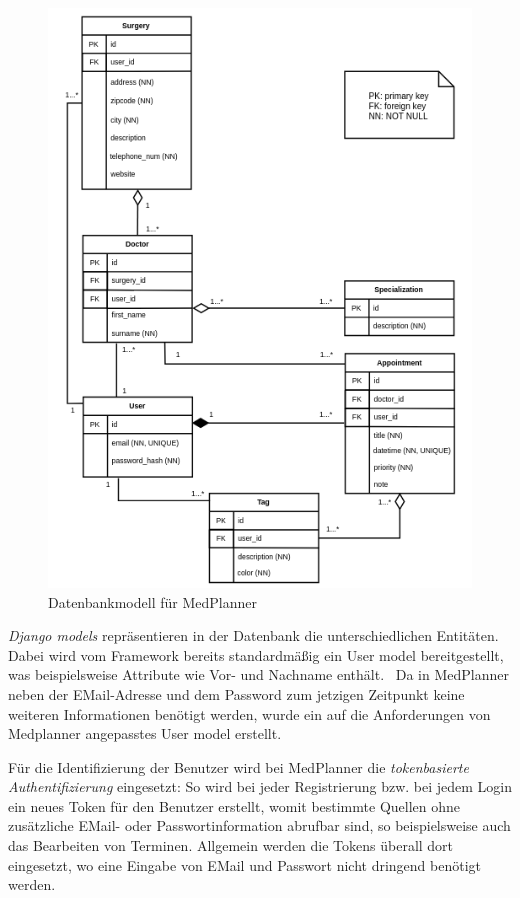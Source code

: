 \documentclass[conference]{IEEEtran}
\begin{document}
\begin{figure}[!h]
	\centering
	\includegraphics[width=\columnwidth]{./figures/concepts}
	\caption{Datenbankmodell für MedPlanner}
\end{figure}
\textit{Django models} repräsentieren in der Datenbank die unterschiedlichen Entitäten. Dabei wird vom Framework bereits standardmäßig ein User model bereitgestellt, was beispielsweise Attribute wie Vor- und Nachname enthält.~\cite{django-default-user} Da in MedPlanner neben der EMail-Adresse und dem Password zum jetzigen Zeitpunkt keine weiteren Informationen benötigt werden, wurde ein auf die Anforderungen von Medplanner angepasstes User model erstellt.

Für die Identifizierung der Benutzer wird bei MedPlanner die \textit{tokenbasierte Authentifizierung} eingesetzt: So wird bei jeder Registrierung bzw. bei jedem Login ein neues Token für den Benutzer erstellt, womit bestimmte Quellen ohne zusätzliche EMail- oder Passwortinformation abrufbar sind, so beispielsweise auch das Bearbeiten von Terminen. Allgemein werden die Tokens überall dort eingesetzt, wo eine Eingabe von EMail und Passwort nicht dringend benötigt werden.
\pagebreak
\end{document}
